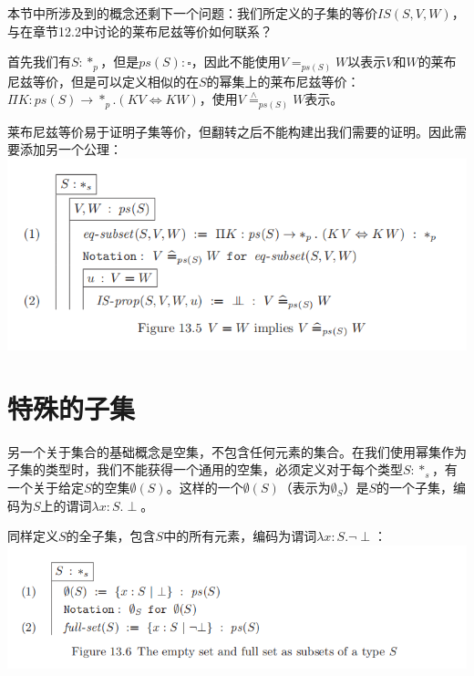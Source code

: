 \documentclass[UTF8]{article}
\begin{document}
		本节中所涉及到的概念还剩下一个问题：我们所定义的子集的等价$IS(S,V,W)$，与在章节12.2中讨论的莱布尼兹等价如何联系？
		
		首先我们有$S:*_p$，但是$ps(S):\square$，因此不能使用$V=_{ps(S)}W$以表示$V$和$W$的莱布尼兹等价，但是可以定义相似的在$S$的幂集上的莱布尼兹等价：$\Pi K:ps(S)\rightarrow*_p.(KV\Leftrightarrow KW)$，使用$V\stackrel{\wedge}{=}_{ps(S)}W$表示。
		
		莱布尼兹等价易于证明子集等价，但翻转之后不能构建出我们需要的证明。因此需要添加另一个公理：\\
		\includegraphics[width=0.93\linewidth]{"../imgs/13-5.png"}
		
	\section{特殊的子集}
	\noindent
	另一个关于集合的基础概念是空集，不包含任何元素的集合。在我们使用幂集作为子集的类型时，我们不能获得一个通用的空集，必须定义对于每个类型$S:*_s$，有一个关于给定$S$的空集$\emptyset(S)$。这样的一个$\emptyset(S)$（表示为$\emptyset_S$）是$S$的一个子集，编码为$S$上的谓词$\lambda x:S.\perp$。
	
		同样定义$S$的全子集，包含$S$中的所有元素，编码为谓词$\lambda x:S.\neg\perp$：\\
		\includegraphics[width=0.93\linewidth]{"../imgs/13-6.png"}
		
\end{document}
